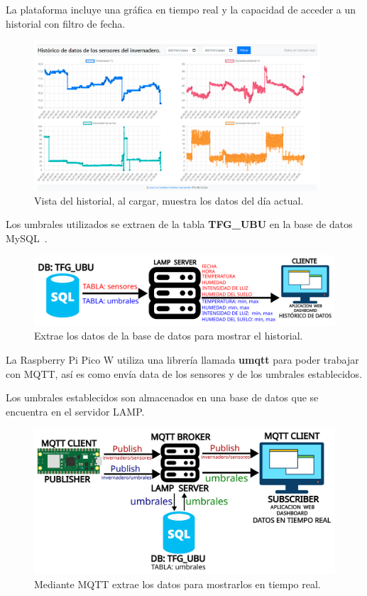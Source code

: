 La plataforma incluye una gráfica en tiempo real y la capacidad de acceder a un historial con filtro de fecha.

\begin{figure}[h]
    \centering
    \includegraphics[width=0.95\textwidth]{img/desarrollo/Dashboard_Historico.png}
    \caption{Vista del historial, al cargar, muestra los datos del día actual.} \label{Img:Dashboard_Historico}
\end{figure}

Los umbrales utilizados se extraen de la tabla \textbf{TFG\_UBU} en la base de datos MySQL~\cite{misc:Mysql}.

\begin{figure}[h]
    \centering
    \includegraphics[width=1\textwidth]{img/diagramas/mqtt_dashboard_Historico.png}
    \caption{Extrae los datos de la base de datos para mostrar el historial.} \label{Img:Dashboard_diagrama_Historico}
\end{figure}

La Raspberry Pi Pico W utiliza una librería llamada \textbf{umqtt} para poder trabajar con MQTT, así es como envía data de los sensores y de los umbrales establecidos.

Los umbrales establecidos son almacenados en una base de datos que se encuentra en el servidor LAMP.

\begin{figure}[h]
    \centering
    \includegraphics[width=1\textwidth]{img/diagramas/mqtt_dashboard_TiempoReal.png}
    \caption{Mediante MQTT extrae los datos para mostrarlos en tiempo real.} \label{Img:Dashboard_diagrama_TiempoReal}
\end{figure}

